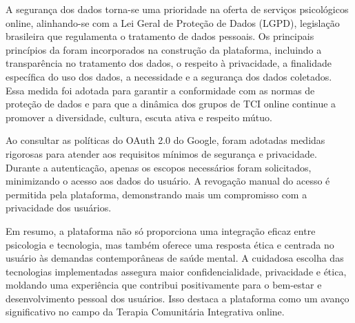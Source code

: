 A segurança dos dados torna-se uma prioridade na oferta de serviços psicológicos online, alinhando-se com a Lei Geral de Proteção de Dados (LGPD), legislação brasileira que regulamenta o tratamento de dados pessoais. Os principais princípios da \cite{LGPD} foram incorporados na construção da plataforma, incluindo a transparência no tratamento dos dados, o respeito à privacidade, a finalidade específica do uso dos dados, a necessidade e a segurança dos dados coletados. Essa medida foi adotada para garantir a conformidade com as normas de proteção de dados e para que a dinâmica dos grupos de TCI online continue a promover a diversidade, cultura, escuta ativa e respeito mútuo.

Ao consultar as políticas do OAuth 2.0 do Google, foram adotadas medidas rigorosas para atender aos requisitos mínimos de segurança e privacidade. Durante a autenticação, apenas os escopos necessários foram solicitados, minimizando o acesso aos dados do usuário. A revogação manual do acesso é permitida pela plataforma, demonstrando mais um compromisso com a privacidade dos usuários.\cite{OAUTHSCOPES}

Em resumo, a plataforma não só proporciona uma integração eficaz entre psicologia e tecnologia, mas também oferece uma resposta ética e centrada no usuário às demandas contemporâneas de saúde mental. A cuidadosa escolha das tecnologias implementadas assegura maior confidencialidade, privacidade e ética, moldando uma experiência que contribui positivamente para o bem-estar e desenvolvimento pessoal dos usuários. Isso destaca a plataforma como um avanço significativo no campo da Terapia Comunitária Integrativa online.


